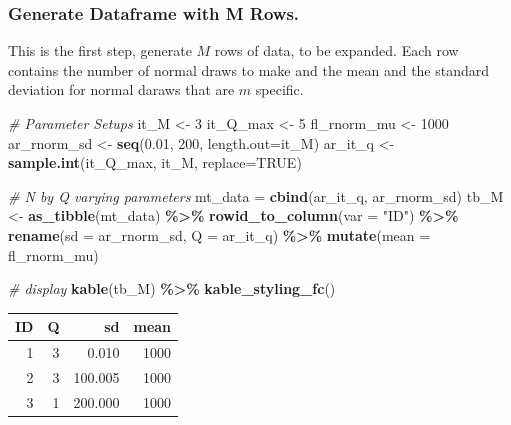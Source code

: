\documentclass[
]{book}
\newenvironment{Shaded}{\begin{snugshade}}{\end{snugshade}}
\newcommand{\CommentTok}[1]{\textcolor[rgb]{0.56,0.35,0.01}{\textit{#1}}}
\newcommand{\DataTypeTok}[1]{\textcolor[rgb]{0.13,0.29,0.53}{#1}}
\newcommand{\DecValTok}[1]{\textcolor[rgb]{0.00,0.00,0.81}{#1}}
\newcommand{\FloatTok}[1]{\textcolor[rgb]{0.00,0.00,0.81}{#1}}
\newcommand{\KeywordTok}[1]{\textcolor[rgb]{0.13,0.29,0.53}{\textbf{#1}}}
\newcommand{\NormalTok}[1]{#1}
\newcommand{\OperatorTok}[1]{\textcolor[rgb]{0.81,0.36,0.00}{\textbf{#1}}}
\newcommand{\OtherTok}[1]{\textcolor[rgb]{0.56,0.35,0.01}{#1}}
\newcommand{\StringTok}[1]{\textcolor[rgb]{0.31,0.60,0.02}{#1}}
\begin{document}
\hypertarget{generate-dataframe-with-m-rows.}{%
\subsubsection{Generate Dataframe with M Rows.}\label{generate-dataframe-with-m-rows.}}

This is the first step, generate \(M\) rows of data, to be expanded. Each row contains the number of normal draws to make and the mean and the standard deviation for normal daraws that are \(m\) specific.

\begin{Shaded}
\begin{Highlighting}[]
\CommentTok{\# Parameter Setups}
\NormalTok{it\_M \textless{}{-}}\StringTok{ }\DecValTok{3}
\NormalTok{it\_Q\_max \textless{}{-}}\StringTok{ }\DecValTok{5}
\NormalTok{fl\_rnorm\_mu \textless{}{-}}\StringTok{ }\DecValTok{1000}
\NormalTok{ar\_rnorm\_sd \textless{}{-}}\StringTok{ }\KeywordTok{seq}\NormalTok{(}\FloatTok{0.01}\NormalTok{, }\DecValTok{200}\NormalTok{, }\DataTypeTok{length.out=}\NormalTok{it\_M)}
\NormalTok{ar\_it\_q \textless{}{-}}\StringTok{ }\KeywordTok{sample.int}\NormalTok{(it\_Q\_max, it\_M, }\DataTypeTok{replace=}\OtherTok{TRUE}\NormalTok{)}

\CommentTok{\# N by Q varying parameters}
\NormalTok{mt\_data =}\StringTok{ }\KeywordTok{cbind}\NormalTok{(ar\_it\_q, ar\_rnorm\_sd)}
\NormalTok{tb\_M \textless{}{-}}\StringTok{ }\KeywordTok{as\_tibble}\NormalTok{(mt\_data) }\OperatorTok{\%\textgreater{}\%}\StringTok{ }\KeywordTok{rowid\_to\_column}\NormalTok{(}\DataTypeTok{var =} \StringTok{"ID"}\NormalTok{) }\OperatorTok{\%\textgreater{}\%}
\StringTok{                }\KeywordTok{rename}\NormalTok{(}\DataTypeTok{sd =}\NormalTok{ ar\_rnorm\_sd, }\DataTypeTok{Q =}\NormalTok{ ar\_it\_q) }\OperatorTok{\%\textgreater{}\%}
\StringTok{                }\KeywordTok{mutate}\NormalTok{(}\DataTypeTok{mean =}\NormalTok{ fl\_rnorm\_mu)}

\CommentTok{\# display}
\KeywordTok{kable}\NormalTok{(tb\_M) }\OperatorTok{\%\textgreater{}\%}
\StringTok{  }\KeywordTok{kable\_styling\_fc}\NormalTok{()}
\end{Highlighting}
\end{Shaded}

\begin{table}[!h]
\centering
\begin{tabular}{r|r|r|r}
\hline
ID & Q & sd & mean\\
\hline
\rowcolor{gray!6}  1 & 3 & 0.010 & 1000\\
\hline
2 & 3 & 100.005 & 1000\\
\hline
\rowcolor{gray!6}  3 & 1 & 200.000 & 1000\\
\hline
\end{tabular}
\end{table}
\end{document}
